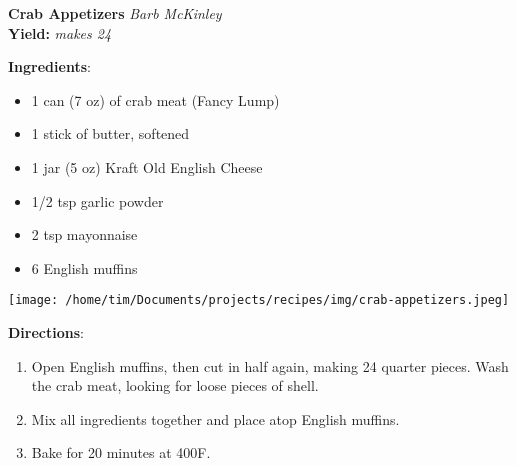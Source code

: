 \documentclass[11pt, twoside, openany]{book}
\begin{document}
\noindent\begin{minipage}[t]{\linewidth}%
{\Large\textbf{Crab Appetizers}} \label{crab-appetizers}\hfill\textit{Barb McKinley}\\
\textbf{Yield:} \textit{makes 24}\\
\noindent\begin{minipage}[t]{0.78\linewidth}%
\textbf{Ingredients}:\vspace{-3mm}
\begin{multicols}{2}
\begin{itemize}\setlength\itemsep{-1mm}
\item 1 can (7 oz) of crab meat (Fancy Lump)
\item 1 stick of butter, softened
\item 1 jar (5 oz) Kraft Old English Cheese
\item 1/2 tsp garlic powder
\item 2 tsp mayonnaise
\item 6 English muffins
\end{itemize}
\end{multicols}
\end{minipage}
\noindent\begin{minipage}[t]{0.18\linewidth}
\centering \strut\vspace*{-\baselineskip}\newline
\texttt{[image: /home/tim/Documents/projects/recipes/img/crab-appetizers.jpeg]}\\
\end{minipage}\vspace{3mm}
\textbf{Directions}:
\vspace{-3mm}\begin{enumerate}\setlength\itemsep{-1mm}
\item Open English muffins, then cut in half again, making 24 quarter pieces. Wash the crab meat, looking for loose pieces of shell.
\item Mix all ingredients together and place atop English muffins.
\item Bake for 20 minutes at 400F.
\end{enumerate}
\end{minipage}\vspace{8mm}
\end{document}
